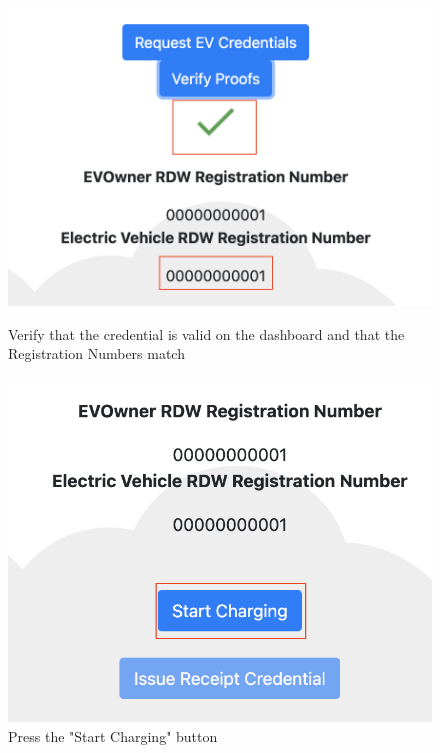\begin{figure}[H]
\centering
\begin{minipage}{.5\textwidth}
  \centering
  \includegraphics[width=.9\linewidth]{images/Frontend/Charging/10.png}
  \caption[]{Verify that the credential is valid on the dashboard and that the Registration Numbers match}
  \label{fig:charging_screenshot_10}
\end{minipage}%
\begin{minipage}{.5\textwidth}
  \centering
  \includegraphics[width=.9\linewidth]{images/Frontend/Charging/11.png}
  \caption[]{Press the "Start Charging" button}
  \label{fig:charging_screenshot_11}
\end{minipage}
\end{figure}

